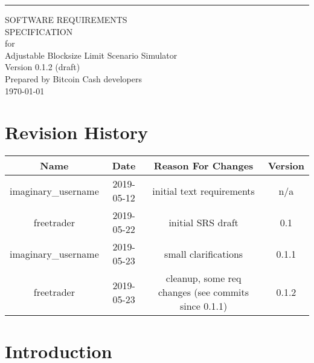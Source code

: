 \documentclass{scrreprt}
\date{}
\def\myversion{0.1.2 }
\begin{document}
\begin{flushright}
  \rule{16cm}{5pt}\vskip1cm
  \begin{bfseries}
    \Huge{SOFTWARE REQUIREMENTS\\ SPECIFICATION}\\
    \vspace{1.9cm}
    for\\
    \vspace{1.9cm}
    Adjustable Blocksize Limit Scenario Simulator\\
    \vspace{1.9cm}
    \LARGE{Version \myversion (draft)}\\
    \vspace{1.9cm}
    Prepared by Bitcoin Cash developers\\
    \vspace{1.9cm}
    \today\\
  \end{bfseries}
\end{flushright}

\tableofcontents

\chapter*{Revision History}

  \begin{center}
    \begin{tabular}{|c|c|c|c|}
      \hline
      Name                & Date       & Reason For Changes                                  & Version \\
      \hline
      imaginary\_username & 2019-05-12 & initial text requirements                           & n/a     \\
      \hline
      freetrader          & 2019-05-22 & initial SRS draft                                   & 0.1     \\
      \hline
      imaginary\_username & 2019-05-23 & small clarifications                                & 0.1.1   \\
      \hline
      freetrader          & 2019-05-23 & cleanup, some req changes (see commits since 0.1.1) & 0.1.2   \\
      \hline
    \end{tabular}
  \end{center}

\chapter{Introduction}
\end{document}
